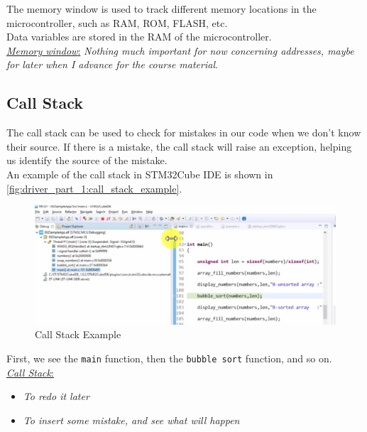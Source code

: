 The memory window is used to track different memory locations in the microcontroller, such as RAM, ROM, FLASH, etc.\\

Data variables are stored in the RAM of the microcontroller.\\

 \underline{\textit{Memory window}:} \textit{Nothing much important for now concerning addresses, maybe for later when I advance for the course material}. 


\subsection{Call Stack}

The call stack can be used to check for mistakes in our code when we don't know their source. If there is a mistake, the call stack will raise an exception, helping us identify the source of the mistake.\\

\newpage
An example of the call stack in STM32Cube IDE is shown in \autoref{fig:driver_part_1:call_stack_example}.

\begin{figure}[h]
\centering
\includegraphics[scale=0.5]{Figures/driver_part_1/call_stack_example}
\caption{Call Stack Example}
\label{fig:driver_part_1:call_stack_example}
\end{figure} 

First, we see the \verb|main| function, then the \verb|bubble sort| function, and so on.\\


 \underline{\textit{Call Stack}:} 

\begin{itemize}
    
    \item \textit{To redo it later} 

    \item \textit{To insert some mistake, and see what will happen}
    
\end{itemize}



